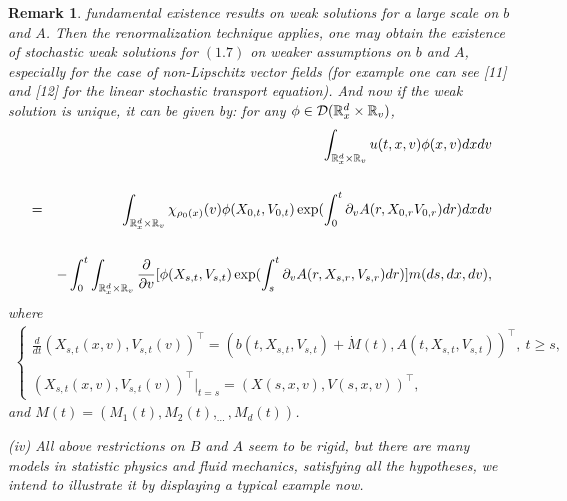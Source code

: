 \documentclass[11pt]{article}
\newtheorem{remark}{Remark}[section]
\def\geq{\geqslant}\def\leq{\leqslant}
\begin{document}
\begin{remark}
fundamental existence results on weak solutions for a large scale on
$b$ and $A$. Then the renormalization technique applies, one may
obtain the existence of stochastic weak solutions for $(1.7)$ on
weaker assumptions on $b$ and $A$, especially for the case of
non-Lipschitz vector fields (for example one can see [11] and [12]
for the linear stochastic transport equation).
 And now if the weak solution is unique, it can be
given by: for any $\phi\in {\mathcal D}({\mathbb R}^d_x\times{\mathbb R}_v)$,
\begin{eqnarray*}
&&\int_{{\mathbb R}^d_x\times {\mathbb R}_v}u(t,x,v)\phi(x,v)dxdv \cr \cr
&=&\int_{{\mathbb R}^d_x\times
{\mathbb R}_v}\chi_{\rho_0(x)}(v)\phi(X_{0,t},V_{0,t})\exp(\int^t_0
\partial_v
A(r,X_{0,r}V_{0,r})dr)dxdv \cr \cr &&- \int_0^t\int_{{\mathbb R}^d_x\times
{\mathbb R}_v}\frac{\partial}{\partial
v}[\phi(X_{s,t},V_{s,t})\exp(\int^t_s\partial_v
A(r,X_{s,r},V_{s,r})dr)] m(ds,dx,dv),
\end{eqnarray*}
where
\begin{eqnarray*}
\left\{
  \begin{array}{ll}
 \frac{d}{dt}(X_{s,t}(x,v),V_{s,t}(v))^\top=(b(t,X_{s,t},V_{s,t})+\dot{M}(t),
A(t,X_{s,t},V_{s,t}))^\top, \ t\geq s, \\ \\ (X_{s,t}(x,v),
V_{s,t}(v))^\top|_{t=s}=(X(s,x,v),V(s,x,v))^\top,
  \end{array}
\right.
\end{eqnarray*}
and $M(t)=(M_1(t),M_2(t),_{\cdots},M_d(t))$.
   \vskip1mm\par
(iv) All above restrictions on $B$ and $A$ seem to be rigid, but
there are many models in statistic physics and fluid mechanics,
satisfying all the hypotheses, we intend to illustrate it by
displaying a typical example now.
  \end{remark}
\end{document}

